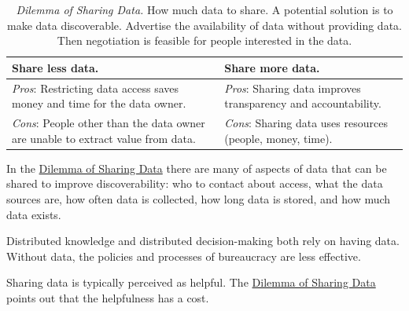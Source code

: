 \begin{center}
\begin{table}[H] %
\begin{tabular}{ | m{\dilemmatablewidth}| m{\dilemmatablewidth} | } 
  \hline
  \textbf{Share less data.} &
  \textbf{Share more data.} \\
  \hline
  \textit{Pros}: Restricting data access saves money and time for the data owner.&
  \textit{Pros}: Sharing data improves transparency and accountability. \\
  \hline
  \textit{Cons}: People other than the data owner are unable to extract value from data. & 
  \textit{Cons}: Sharing data uses resources (people, money, time). \\
  \hline
\end{tabular}
\caption{
\textit{Dilemma of Sharing Data.}
How much data to share. A potential solution is to make data discoverable. Advertise the availability of data without providing data. Then negotiation is feasible for people interested in the data.
}
\label{table:dilemma-data-share-vs-hide}
\end{table}
\end{center}

In the \hyperref[table:dilemma-data-share-vs-hide]{Dilemma of Sharing Data} 
\iftoggle{printedonpaper}{ (\ref{table:dilemma-data-share-vs-hide})}{} there are many of aspects of data that can be 
shared to improve discoverability: who to contact about access, what the data sources are, how often data is collected, how long data is stored, and how much data exists.

Distributed knowledge and distributed decision-making both rely on having data. Without data, the policies and processes of bureaucracy are less effective. 

Sharing data is typically perceived as helpful. 
The \hyperref[table:dilemma-data-share-vs-hide]{Dilemma of Sharing Data} 
\iftoggle{printedonpaper}{ (\ref{table:dilemma-data-share-vs-hide})}{} points out that the helpfulness has a cost. 

